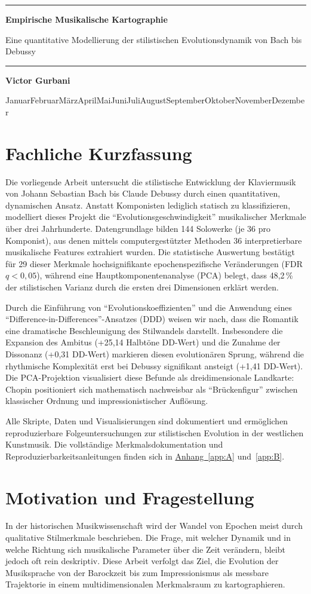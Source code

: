 \documentclass[10pt,a4paper]{article}
\newcommand{\monthyear}{%
    \ifcase\month\or Januar\or Februar\or M\"arz\or April\or Mai\or Juni\or Juli\or August\or September\or Oktober\or November\or Dezember\fi\space \number\year
}
\theoremstyle{definition}
\renewcommand{\maketitle}{
    \begin{titlepage}
        \centering
        \vspace*{1cm}
        {\color{titlecolor}\rule{\linewidth}{1pt}}
        \vspace{1.5cm}

        {\fontsize{28}{34}\selectfont\color{titlecolor}\textbf{Empirische Musikalische Kartographie} \par Eine quantitative Modellierung der stilistischen Evolutionsdynamik von Bach bis Debussy\par}

        \vspace{1.5cm}
        {\color{titlecolor}\rule{\linewidth}{1pt}}
        \vspace{2cm}
        
        {\Large\textbf{Victor Gurbani}\par}
        \vspace{0.5cm}
        {\large \monthyear\par}
        
        \vfill
    \end{titlepage}
}
\begin{document}
\maketitle
\hypersetup{pageanchor=false}
\newpage

    \tableofcontents

\newpage
\setcounter{page}{1}
\hypersetup{pageanchor=true}

\section{Fachliche Kurzfassung}
Die vorliegende Arbeit untersucht die stilistische Entwicklung der Klaviermusik von Johann Sebastian Bach bis Claude Debussy durch einen quantitativen, dynamischen Ansatz. Anstatt Komponisten lediglich statisch zu klassifizieren, modelliert dieses Projekt die \enquote{Evolutionsgeschwindigkeit} musikalischer Merkmale über drei Jahrhunderte. Datengrundlage bilden 144 Solowerke (je 36 pro Komponist), aus denen mittels computergestützter Methoden 36 interpretierbare musikalische Features extrahiert wurden. Die statistische Auswertung bestätigt für 29 dieser Merkmale hochsignifikante epochenspezifische Veränderungen (FDR $q<0{,}05$), während eine Hauptkomponentenanalyse (PCA) belegt, dass 48,2\,\% der stilistischen Varianz durch die ersten drei Dimensionen erklärt werden.

Durch die Einführung von \enquote{Evolutionskoeffizienten} und die Anwendung eines \enquote{Difference-in-Differences}-Ansatzes (DDD) weisen wir nach, dass die Romantik eine dramatische Beschleunigung des Stilwandels darstellt. Insbesondere die Expansion des Ambitus (+25,14 Halbtöne DD-Wert) und die Zunahme der Dissonanz (+0,31 DD-Wert) markieren diesen evolutionären Sprung, während die rhythmische Komplexität erst bei Debussy signifikant ansteigt (+1,41 DD-Wert). Die PCA-Projektion visualisiert diese Befunde als dreidimensionale Landkarte: Chopin positioniert sich mathematisch nachweisbar als \enquote{Brückenfigur} zwischen klassischer Ordnung und impressionistischer Auflösung.

Alle Skripte, Daten und Visualisierungen sind dokumentiert und ermöglichen reproduzierbare Folgeuntersuchungen zur stilistischen Evolution in der westlichen Kunstmusik. Die vollständige Merkmalsdokumentation und Reproduzierbarkeitsanleitungen finden sich in \hyperref[app:A]{Anhang~\ref*{app:A}} und~\hyperref[app:B]{\ref*{app:B}}.

\section{Motivation und Fragestellung}
In der historischen Musikwissenschaft wird der Wandel von Epochen meist durch qualitative Stilmerkmale beschrieben. Die Frage, mit welcher Dynamik und in welche Richtung sich musikalische Parameter über die Zeit verändern, bleibt jedoch oft rein deskriptiv. Diese Arbeit verfolgt das Ziel, die Evolution der Musiksprache von der Barockzeit bis zum Impressionismus als messbare Trajektorie in einem multidimensionalen Merkmalsraum zu kartographieren.
\end{document}

